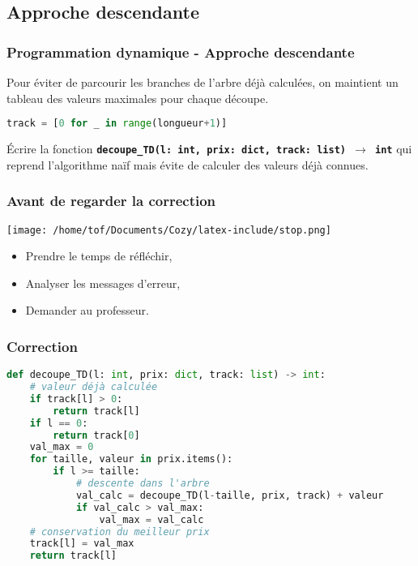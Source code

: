 \documentclass[svgnames,11pt]{beamer}
\begin{document}
\subsection{Approche descendante}
\begin{frame}[fragile]
    \frametitle{Programmation dynamique - Approche descendante}

Pour éviter de parcourir les branches de l'arbre déjà calculées, on maintient un tableau des valeurs maximales pour chaque découpe.
\begin{center}
\begin{lstlisting}[language=Python , basicstyle=\ttfamily\small, xleftmargin=2em, xrightmargin=2em]
track = [0 for _ in range(longueur+1)]
\end{lstlisting}
\end{center}
\begin{activite}
Écrire la fonction \textbf{\texttt{decoupe\_TD(l: int, prix: dict, track: list) $\rightarrow$ int}} qui reprend l'algorithme naïf mais évite de calculer des valeurs déjà connues.
\end{activite}

\end{frame}
\begin{frame}
    \frametitle{Avant de regarder la correction}
\begin{center}
    \centering
    \texttt{[image: /home/tof/Documents/Cozy/latex-include/stop.png]}
    \end{center}
{\Large
    \begin{itemize}
        \item Prendre le temps de réfléchir,
        \item Analyser les messages d'erreur,
        \item Demander au professeur.
    \end{itemize}
}
\end{frame}
\begin{frame}[fragile]
    \frametitle{Correction}
\begin{center}
\begin{lstlisting}[language=Python , basicstyle=\ttfamily\small, xleftmargin=0.2em, xrightmargin=-2em]
def decoupe_TD(l: int, prix: dict, track: list) -> int:
    # valeur déjà calculée
    if track[l] > 0:
        return track[l]
    if l == 0:
        return track[0]
    val_max = 0
    for taille, valeur in prix.items():
        if l >= taille:
            # descente dans l'arbre
            val_calc = decoupe_TD(l-taille, prix, track) + valeur
            if val_calc > val_max:
                val_max = val_calc
    # conservation du meilleur prix
    track[l] = val_max
    return track[l]
\end{lstlisting}
\end{center} 

\end{frame}
\end{document}
